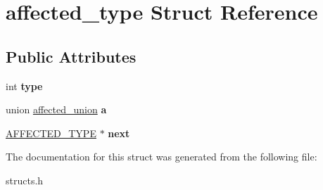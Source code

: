 \hypertarget{structaffected__type}{\section{affected\-\_\-type Struct Reference}
\label{structaffected__type}
}
\subsection*{Public Attributes}
\begin{DoxyCompactItemize}
\item 
\hypertarget{structaffected__type_a410fb6655c3b2788d44f2e17594f3a0e}{int {\bfseries type}}\label{structaffected__type_a410fb6655c3b2788d44f2e17594f3a0e}

\item 
\hypertarget{structaffected__type_ae1e60182287b8f20b93f1b0964fdde0d}{union \hyperlink{unionaffected__union}{affected\-\_\-union} {\bfseries a}}\label{structaffected__type_ae1e60182287b8f20b93f1b0964fdde0d}

\item 
\hypertarget{structaffected__type_a6f728ec76b51ae34e134032d9e538bcb}{\hyperlink{structaffected__type}{A\-F\-F\-E\-C\-T\-E\-D\-\_\-\-T\-Y\-P\-E} $\ast$ {\bfseries next}}\label{structaffected__type_a6f728ec76b51ae34e134032d9e538bcb}

\end{DoxyCompactItemize}


The documentation for this struct was generated from the following file\-:\begin{DoxyCompactItemize}
\item 
structs.\-h\end{DoxyCompactItemize}
